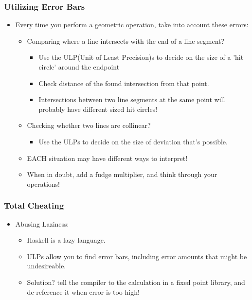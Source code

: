 \documentclass[hyperref={pdfpagemode=FullScreen},aspectratio=169]{beamer}
\begin{document}
\begin{frame}
  \frametitle{Utilizing Error Bars}
  \begin{itemize}
  \item Every time you perform a geometric operation, take into account these errors:
    \begin {itemize}
    \item Comparing where a line intersects with the end of a line segment?
      \begin {itemize}
      \item Use the ULP(Unit of Least Precision)s to decide on the size of a 'hit circle' around the endpoint
      \item Check distance of the found intersection from that point.
      \item Intersections between two line segments at the same point will probably have different sized hit circles!
      \end{itemize}
    \item Checking whether two lines are collinear?
      \begin {itemize}
      \item Use the ULPs to decide on the size of deviation that's possible.
      \end{itemize}
    \item EACH situation may have different ways to interpret!
    \item When in doubt, add a fudge multiplier, and think through your operations!
    \end{itemize}
  \end{itemize}
\end{frame}

\begin{frame}
  \frametitle{Total Cheating}
  \begin{itemize}
  \item Abusing Laziness:
    \begin{itemize}
    \item Haskell is a lazy language.
    \item ULPs allow you to find error bars, including error amounts that might be undesireable.
    \item Solution? tell the compiler to the calculation in a fixed point library, and de-reference it when error is too high!
    \end{itemize}
  \end{itemize}
\end{frame}
\end{document}
